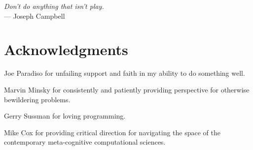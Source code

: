 



\begin{flushright}{\slshape    
Don't do anything that isn't play.} \\ \medskip
    --- Joseph Campbell
\end{flushright}



\bigskip

\begingroup
\let\clearpage\relax
\let\cleardoublepage\relax
\let\cleardoublepage\relax
\chapter*{Acknowledgments}

Joe Paradiso for unfailing support and faith in my ability to do
something well.

Marvin Minsky for consistently and patiently providing perspective for
otherwise bewildering problems.

Gerry Sussman for loving programming.

Mike Cox for providing critical direction for navigating the space of
the contemporary meta-cognitive computational sciences.



\endgroup



